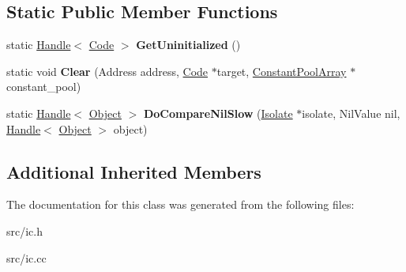 \subsection*{Static Public Member Functions}
\begin{DoxyCompactItemize}
\item 
\hypertarget{classv8_1_1internal_1_1_compare_nil_i_c_af06ccbb67db5dc295326ac2ec142d22c}{}static \hyperlink{classv8_1_1internal_1_1_handle}{Handle}$<$ \hyperlink{classv8_1_1internal_1_1_code}{Code} $>$ {\bfseries Get\+Uninitialized} ()\label{classv8_1_1internal_1_1_compare_nil_i_c_af06ccbb67db5dc295326ac2ec142d22c}

\item 
\hypertarget{classv8_1_1internal_1_1_compare_nil_i_c_aa949035bb53d735005a45da0748d225d}{}static void {\bfseries Clear} (Address address, \hyperlink{classv8_1_1internal_1_1_code}{Code} $\ast$target, \hyperlink{classv8_1_1internal_1_1_constant_pool_array}{Constant\+Pool\+Array} $\ast$constant\+\_\+pool)\label{classv8_1_1internal_1_1_compare_nil_i_c_aa949035bb53d735005a45da0748d225d}

\item 
\hypertarget{classv8_1_1internal_1_1_compare_nil_i_c_a27345dd7dcef9b9ec6e5195854911ffe}{}static \hyperlink{classv8_1_1internal_1_1_handle}{Handle}$<$ \hyperlink{classv8_1_1internal_1_1_object}{Object} $>$ {\bfseries Do\+Compare\+Nil\+Slow} (\hyperlink{classv8_1_1internal_1_1_isolate}{Isolate} $\ast$isolate, Nil\+Value nil, \hyperlink{classv8_1_1internal_1_1_handle}{Handle}$<$ \hyperlink{classv8_1_1internal_1_1_object}{Object} $>$ object)\label{classv8_1_1internal_1_1_compare_nil_i_c_a27345dd7dcef9b9ec6e5195854911ffe}

\end{DoxyCompactItemize}
\subsection*{Additional Inherited Members}


The documentation for this class was generated from the following files\+:\begin{DoxyCompactItemize}
\item 
src/ic.\+h\item 
src/ic.\+cc\end{DoxyCompactItemize}
